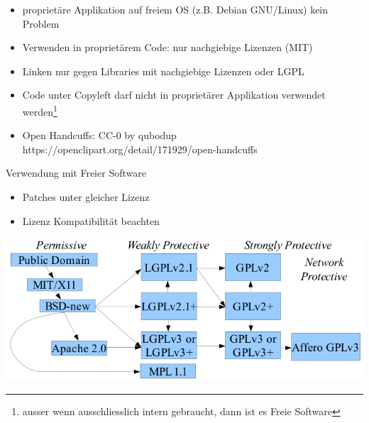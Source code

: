 \note
{
	\begin{itemize}
		\item proprietäre Applikation auf freiem OS (z.B. Debian GNU/Linux) kein Problem
		\item Verwenden in proprietärem Code: nur nachgiebige Lizenzen (MIT)
		\item Linken nur gegen Libraries mit nachgiebige Lizenzen oder LGPL
		\item Code unter Copyleft darf nicht in proprietärer Applikation verwendet werden\footnote{ausser wenn ausschliesslich intern gebraucht, dann ist es Freie Software}
		\item Open Handcuffs: CC-0 by qubodup https://openclipart.org/detail/171929/open-handcuffs
	\end{itemize}
}

\begin{frame}{Verwendung mit Freier Software}
	\begin{itemize}
		\item Patches unter gleicher Lizenz
		\item Lizenz Kompatibilität beachten
	\end{itemize}
	\begin{center}
		\includegraphics[width=\textwidth]{res/floss-license-compability.png}
	\end{center}
\end{frame}

